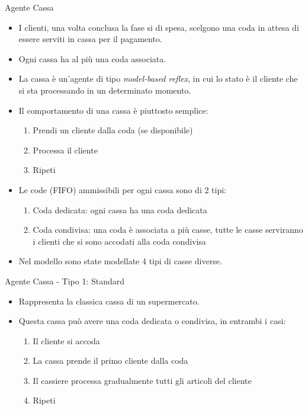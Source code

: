 \begin{frame}{Agente Cassa}
	\begin{itemize}
		\item I clienti, una volta conclusa la fase si di spesa, scelgono una coda in attesa di essere serviti in cassa per il pagamento.
		\item Ogni cassa ha al più una coda associata.
		\item La cassa è un'agente di tipo \textit{model-based reflex}, in cui lo stato è il cliente che si sta processando in un determinato momento.
		\item Il comportamento di una cassa è piuttosto semplice:
		\begin{enumerate}
			\item Prendi un cliente dalla coda (se disponibile)
			\item Processa il cliente
			\item Ripeti
		\end{enumerate}
		\item Le code (FIFO) ammissibili per ogni cassa sono di 2 tipi:
		\begin{enumerate}
			\item Coda dedicata: ogni cassa ha una coda dedicata
			\item Coda condivisa: una coda è associata a più casse, tutte le casse serviranno i clienti che si sono accodati alla coda condivisa
		\end{enumerate}
		\item Nel modello sono state modellate 4 tipi di casse diverse.
		
	\end{itemize}
\end{frame}

\begin{frame}{Agente Cassa - Tipo 1: Standard}
	\begin{itemize}
		\item Rappresenta la classica cassa di un supermercato.
		\item Questa cassa può avere una coda dedicata o condivisa, in entrambi i casi:
		\begin{enumerate}
			\item Il cliente si accoda
			\item La cassa prende il primo cliente dalla coda
			\item Il cassiere processa gradualmente tutti gli articoli del cliente
			\item Ripeti
		\end{enumerate}		
	\end{itemize}
\end{frame}

